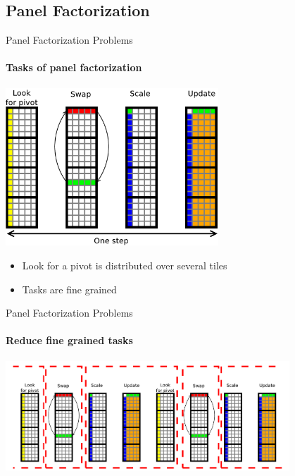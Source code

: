 \subsection{Panel Factorization}

\begin{frame}{Panel Factorization Problems}
\framesubtitle{Tasks of panel factorization}
\begin{center}
\includegraphics[width=0.6\textwidth]{panel_operation}
\end{center}
\begin{center}
\pause
\begin{itemize}
\item \alert{Look for a pivot is distributed over several tiles}
\item \alert{Tasks are fine grained}
\end{itemize}
\end{center}
\end{frame}

\begin{frame}{Panel Factorization Problems}
\framesubtitle{Reduce fine grained tasks}
\begin{center}
\includegraphics[width=0.8\textwidth]{merge}
\end{center}
\end{frame}


